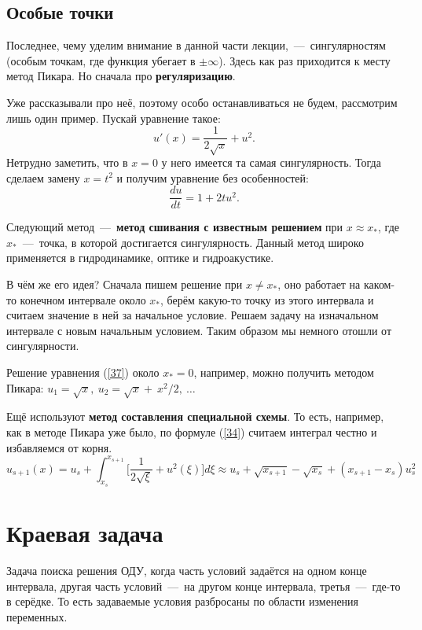 \documentclass[a4,14pt,russian]{article}
\begin{document}
\subsection{Особые точки}\label{point}
    Последнее, чему уделим внимание в данной части лекции,~---~сингулярностям (особым точкам, где функция убегает в $\pm\infty$). Здесь как раз приходится к месту метод Пикара. Но сначала про {\bf регуляризацию}.\par
    Уже рассказывали про неё, поэтому особо останавливаться не будем, рассмотрим лишь один пример. Пускай уравнение такое:
    \begin{equation}\label{37}
     u'(x) = \frac1{2\sqrt{x}} + u^2.
    \end{equation}
    Нетрудно заметить, что в $x=0$ у него имеется та самая сингулярность. Тогда сделаем замену $x=t^2$ и получим уравнение без особенностей:
    \begin{equation}
     \frac{du}{dt} = 1 + 2tu^2.
    \end{equation}\par
    Следующий метод~---~{\bf метод сшивания с известным решением} при $x \approx x_*$, где $x_*$~---~точка, в которой достигается сингулярность. Данный метод широко применяется в гидродинамике, оптике и гидроакустике.\par
    В чём же его идея? Сначала пишем решение при $x \not= x_*$, оно работает на каком-то конечном интервале около $x_*$, берём какую-то точку из этого интервала и считаем значение в ней за начальное условие. Решаем задачу на изначальном интервале с новым начальным условием. Таким образом мы немного отошли от сингулярности.\par
    Решение уравнения (\ref{37}) около $x_* = 0$, например, можно получить методом Пикара: $u_1 = \sqrt{x},\ u_2 = \sqrt{x} + \ {x^2}/{2},\ \ldots$\\ \par
    
    Ещё используют {\bf метод составления специальной схемы}. То есть, например, как в методе Пикара уже было, по формуле (\ref{34}) считаем интеграл честно и избавляемся от корня.
    \begin{equation}
     u_{s+1}(x) = u_s + \int_{x_s}^{x_{s+1}} \biggl[ \frac1{2\sqrt{\xi}}+u^2(\xi)\biggr] d \xi \approx u_s + \sqrt{x_{s+1}}-\sqrt{x_{s}} + (x_{s+1}-x_s)u_s^2
    \end{equation}
\section{Краевая задача} 
    Задача поиска решения ОДУ, когда часть условий задаётся на одном конце интервала, другая часть условий~---~на другом конце интервала, третья~---~где-то в серёдке. То есть задаваемые условия разбросаны по области изменения переменных.
\end{document}
